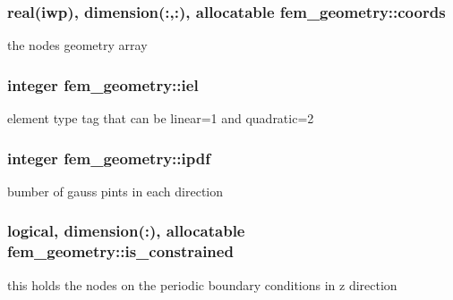 \subsubsection[{coords}]{\setlength{\rightskip}{0pt plus 5cm}real(iwp), dimension(\+:,\+:), allocatable fem\+\_\+geometry\+::coords}\label{classfem__geometry_ad74fb946f3d6ddc2d5c295614927ef99}


the nodes geometry array 

\hypertarget{classfem__geometry_ac37a04b723d229689bc13db9a32a20c7}{}
\subsubsection[{iel}]{\setlength{\rightskip}{0pt plus 5cm}integer fem\+\_\+geometry\+::iel}\label{classfem__geometry_ac37a04b723d229689bc13db9a32a20c7}


element type tag that can be linear=1 and quadratic=2 

\hypertarget{classfem__geometry_affb4f5c597a449d349b7c10cb73c1d12}{}
\subsubsection[{ipdf}]{\setlength{\rightskip}{0pt plus 5cm}integer fem\+\_\+geometry\+::ipdf}\label{classfem__geometry_affb4f5c597a449d349b7c10cb73c1d12}


bumber of gauss pints in each direction 

\hypertarget{classfem__geometry_ab058584f233ff569d79a9b0841bfc589}{}
\subsubsection[{is\+\_\+constrained}]{\setlength{\rightskip}{0pt plus 5cm}logical, dimension(\+:), allocatable fem\+\_\+geometry\+::is\+\_\+constrained}\label{classfem__geometry_ab058584f233ff569d79a9b0841bfc589}


this holds the nodes on the periodic boundary conditions in z direction 

\hypertarget{classfem__geometry_af6fe274e6f297c581b171d1b2e03372c}{}
